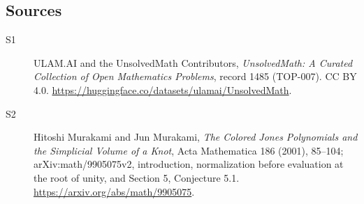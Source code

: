 \documentclass[11pt]{article}
\begin{document}
\subsection{Sources}
\begin{description}
\item[\hypertarget{source:1485:1}{S1}] ULAM.AI and the UnsolvedMath Contributors, \emph{UnsolvedMath: A Curated Collection of Open Mathematics Problems}, record 1485 (TOP-007). CC BY 4.0. \url{https://huggingface.co/datasets/ulamai/UnsolvedMath}.
\item[\hypertarget{source:1485:2}{S2}] Hitoshi Murakami and Jun Murakami, \emph{The Colored Jones Polynomials and the Simplicial Volume of a Knot}, Acta Mathematica 186 (2001), 85--104; arXiv:math/9905075v2, introduction, normalization before evaluation at the root of unity, and Section 5, Conjecture 5.1. \url{https://arxiv.org/abs/math/9905075}.
\end{description}
\label{end:1485}
\end{document}
